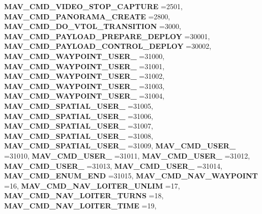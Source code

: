 \begin{DoxyCompactItemize}
\newline
\textbf{ M\+A\+V\+\_\+\+C\+M\+D\+\_\+\+V\+I\+D\+E\+O\+\_\+\+S\+T\+O\+P\+\_\+\+C\+A\+P\+T\+U\+RE} =2501, 
\textbf{ M\+A\+V\+\_\+\+C\+M\+D\+\_\+\+P\+A\+N\+O\+R\+A\+M\+A\+\_\+\+C\+R\+E\+A\+TE} =2800, 
\textbf{ M\+A\+V\+\_\+\+C\+M\+D\+\_\+\+D\+O\+\_\+\+V\+T\+O\+L\+\_\+\+T\+R\+A\+N\+S\+I\+T\+I\+ON} =3000, 
\textbf{ M\+A\+V\+\_\+\+C\+M\+D\+\_\+\+P\+A\+Y\+L\+O\+A\+D\+\_\+\+P\+R\+E\+P\+A\+R\+E\+\_\+\+D\+E\+P\+L\+OY} =30001, 
\newline
\textbf{ M\+A\+V\+\_\+\+C\+M\+D\+\_\+\+P\+A\+Y\+L\+O\+A\+D\+\_\+\+C\+O\+N\+T\+R\+O\+L\+\_\+\+D\+E\+P\+L\+OY} =30002, 
\textbf{ M\+A\+V\+\_\+\+C\+M\+D\+\_\+\+W\+A\+Y\+P\+O\+I\+N\+T\+\_\+\+U\+S\+E\+R\+\_} =31000, 
\textbf{ M\+A\+V\+\_\+\+C\+M\+D\+\_\+\+W\+A\+Y\+P\+O\+I\+N\+T\+\_\+\+U\+S\+E\+R\+\_} =31001, 
\textbf{ M\+A\+V\+\_\+\+C\+M\+D\+\_\+\+W\+A\+Y\+P\+O\+I\+N\+T\+\_\+\+U\+S\+E\+R\+\_} =31002, 
\newline
\textbf{ M\+A\+V\+\_\+\+C\+M\+D\+\_\+\+W\+A\+Y\+P\+O\+I\+N\+T\+\_\+\+U\+S\+E\+R\+\_} =31003, 
\textbf{ M\+A\+V\+\_\+\+C\+M\+D\+\_\+\+W\+A\+Y\+P\+O\+I\+N\+T\+\_\+\+U\+S\+E\+R\+\_} =31004, 
\textbf{ M\+A\+V\+\_\+\+C\+M\+D\+\_\+\+S\+P\+A\+T\+I\+A\+L\+\_\+\+U\+S\+E\+R\+\_} =31005, 
\textbf{ M\+A\+V\+\_\+\+C\+M\+D\+\_\+\+S\+P\+A\+T\+I\+A\+L\+\_\+\+U\+S\+E\+R\+\_} =31006, 
\newline
\textbf{ M\+A\+V\+\_\+\+C\+M\+D\+\_\+\+S\+P\+A\+T\+I\+A\+L\+\_\+\+U\+S\+E\+R\+\_} =31007, 
\textbf{ M\+A\+V\+\_\+\+C\+M\+D\+\_\+\+S\+P\+A\+T\+I\+A\+L\+\_\+\+U\+S\+E\+R\+\_} =31008, 
\textbf{ M\+A\+V\+\_\+\+C\+M\+D\+\_\+\+S\+P\+A\+T\+I\+A\+L\+\_\+\+U\+S\+E\+R\+\_} =31009, 
\textbf{ M\+A\+V\+\_\+\+C\+M\+D\+\_\+\+U\+S\+E\+R\+\_} =31010, 
\newline
\textbf{ M\+A\+V\+\_\+\+C\+M\+D\+\_\+\+U\+S\+E\+R\+\_} =31011, 
\textbf{ M\+A\+V\+\_\+\+C\+M\+D\+\_\+\+U\+S\+E\+R\+\_} =31012, 
\textbf{ M\+A\+V\+\_\+\+C\+M\+D\+\_\+\+U\+S\+E\+R\+\_} =31013, 
\textbf{ M\+A\+V\+\_\+\+C\+M\+D\+\_\+\+U\+S\+E\+R\+\_} =31014, 
\newline
\textbf{ M\+A\+V\+\_\+\+C\+M\+D\+\_\+\+E\+N\+U\+M\+\_\+\+E\+ND} =31015, 
\textbf{ M\+A\+V\+\_\+\+C\+M\+D\+\_\+\+N\+A\+V\+\_\+\+W\+A\+Y\+P\+O\+I\+NT} =16, 
\textbf{ M\+A\+V\+\_\+\+C\+M\+D\+\_\+\+N\+A\+V\+\_\+\+L\+O\+I\+T\+E\+R\+\_\+\+U\+N\+L\+IM} =17, 
\textbf{ M\+A\+V\+\_\+\+C\+M\+D\+\_\+\+N\+A\+V\+\_\+\+L\+O\+I\+T\+E\+R\+\_\+\+T\+U\+R\+NS} =18, 
\newline
\textbf{ M\+A\+V\+\_\+\+C\+M\+D\+\_\+\+N\+A\+V\+\_\+\+L\+O\+I\+T\+E\+R\+\_\+\+T\+I\+ME} =19, 

\end{DoxyCompactItemize}
